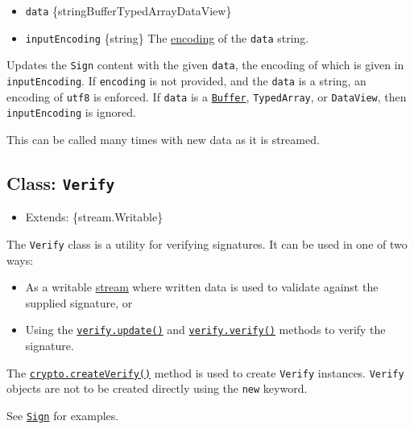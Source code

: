 \begin{itemize}
\tightlist
\item
  \texttt{data}
  \{string\textbar Buffer\textbar TypedArray\textbar DataView\}
\item
  \texttt{inputEncoding} \{string\} The
  \href{buffer.md\#buffers-and-character-encodings}{encoding} of the
  \texttt{data} string.
\end{itemize}

Updates the \texttt{Sign} content with the given \texttt{data}, the
encoding of which is given in \texttt{inputEncoding}. If
\texttt{encoding} is not provided, and the \texttt{data} is a string, an
encoding of \texttt{\textquotesingle{}utf8\textquotesingle{}} is
enforced. If \texttt{data} is a \href{buffer.md}{\texttt{Buffer}},
\texttt{TypedArray}, or \texttt{DataView}, then \texttt{inputEncoding}
is ignored.

This can be called many times with new data as it is streamed.

\subsection{\texorpdfstring{Class:
\texttt{Verify}}{Class: Verify}}\label{class-verify}

\begin{itemize}
\tightlist
\item
  Extends: \{stream.Writable\}
\end{itemize}

The \texttt{Verify} class is a utility for verifying signatures. It can
be used in one of two ways:

\begin{itemize}
\tightlist
\item
  As a writable \href{stream.md}{stream} where written data is used to
  validate against the supplied signature, or
\item
  Using the
  \hyperref[verifyupdatedata-inputencoding]{\texttt{verify.update()}}
  and
  \hyperref[verifyverifyobject-signature-signatureencoding]{\texttt{verify.verify()}}
  methods to verify the signature.
\end{itemize}

The
\hyperref[cryptocreateverifyalgorithm-options]{\texttt{crypto.createVerify()}}
method is used to create \texttt{Verify} instances. \texttt{Verify}
objects are not to be created directly using the \texttt{new} keyword.

See \hyperref[class-sign]{\texttt{Sign}} for examples.

